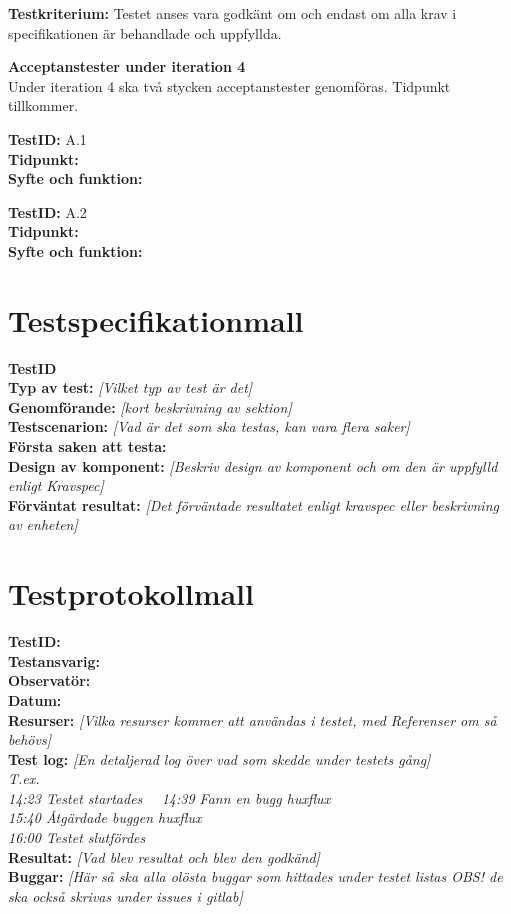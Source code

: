 \documentclass[a4paper,10pt, twoside]{article}
\begin{document}
\textbf{Testkriterium:} Testet anses vara godkänt om och endast om alla krav i specifikationen är behandlade och 
uppfyllda.
\clearpage

\textbf{Acceptanstester under iteration 4}
\\ Under iteration 4 ska två stycken acceptanstester genomföras. Tidpunkt tillkommer. 

	\textbf{TestID:} A.1
 \\ \textbf{Tidpunkt:}
 \\ \textbf{Syfte och funktion:} 

 	\textbf{TestID:} A.2
 \\ \textbf{Tidpunkt:}
 \\ \textbf{Syfte och funktion:}

\printbibliography

\newpage

\appendix
\section{Testspecifikationmall}
\label{sec: Testspecifikationmall}

\textbf{TestID}
\\ \textbf{Typ av test:} \emph{[Vilket typ av test är det]}
\\ \textbf{Genomförande:} \emph{[kort beskrivning av sektion]}
\\ \textbf{Testscenarion:} \emph{[Vad är det som ska testas, kan vara flera saker]}
\\ \textbf{Första saken att testa:}
\\ \textbf{Design av komponent:} \emph{[Beskriv design av komponent och om den är uppfylld enligt Kravspec]}
\\ \textbf{Förväntat resultat:} \emph{[Det förväntade resultatet enligt kravspec eller beskrivning av enheten]}

\newpage

\section{Testprotokollmall}
\label{sec: Testprotokollmall}

\textbf{TestID:}
\\ \textbf{Testansvarig:\\Observatör:}
\\ \textbf{Datum:}
\\ \textbf{Resurser:} \emph{[Vilka resurser kommer att användas i testet, med Referenser om så behövs]}
\\ \textbf{Test log:} \emph{[En detaljerad log över vad som skedde under testets gång]\\ T.ex. \\ 14:23 Testet startades \
\ 14:39 Fann en bugg huxflux \\ 15:40 Åtgärdade buggen huxflux \\ 16:00 Testet slutfördes}\
\\ \textbf{Resultat:} \emph{[Vad blev resultat och blev den godkänd]}
\\ \textbf{Buggar:} \emph{[Här så ska alla olösta buggar som hittades under testet listas OBS! de ska också skrivas under 
issues i gitlab]}
\end{document}
